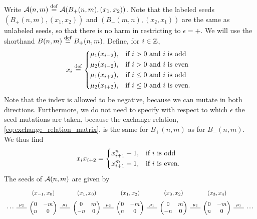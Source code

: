 \begin{example}
	Write $\mathcal{A}(n,m) \overset{\mathrm{def}}{=} \mathcal{A}(B_{+}(n,m), (x_1, x_2))$. Note that the labeled seeds
	$(B_{+}(n,m), (x_1, x_2))$ and $(B_{-}(m, n), (x_2, x_1))$ are the same as unlabeled
	seeds, so that there is no harm in restricting to $\epsilon = +$. We will use the
	shorthand $B(n,m) \overset{\mathrm{def}}{=} B_{+}(n,m)$. Define, for $i \in \mathbb{Z}$,
	\begin{equation*}
		x_i \defeq  \begin{dcases*}
			\mu_1 (x_{i-2}), & if $i > 0$ and $i$ is odd      \\
			\mu_2 (x_{i-2}), & if $i > 0$ and $i$ is even     \\
			\mu_1 (x_{i+2}), & if $i \leq 0$ and $i$ is odd   \\
			\mu_2 (x_{i+2}), & if $i \leq 0$ and $i$ is even.
		\end{dcases*}
	\end{equation*}
	Note that the index is allowed to be negative, because we can mutate in both directions. Furthermore, we do not need to specify with respect to which $\epsilon$ the seed mutations are taken, because
	the exchange relation, \cref{eq:exchange_relation_matrix}, is the same for $B_{+}(n,m)$
	as for $B_{-}(n,m)$. We thus find
	\begin{equation}\label{eq:recurrence_rank2}
		x_i x_{i+2} = \begin{dcases*}
			x_{i+1}^n + 1, & if $i$ is odd   \\
			x_{i+1}^m + 1, & if $i$ is even.
		\end{dcases*}
	\end{equation}
	The seeds of $\mathcal{A}(n,m)$ are given by
	\begin{equation*}
		\begin{tikzcd}[sep=scriptsize, row sep= 0.1em, ampersand replacement=\&]
			\& (x_{-1}, x_0) \& (x_{1}, x_0) \& (x_1, x_2) \& (x_3, x_2) \& (x_3, x_4)\\
			\cdots \rar[dash, "\mu_2"] \&\begin{pmatrix}
				0 & -m \\
				n & 0
			\end{pmatrix}
			\rar[dash, "\mu_1"] \&\begin{pmatrix}
				0  & m \\
				-n & 0
			\end{pmatrix}
			\rar[dash, "\mu_2"] \&\begin{pmatrix}
				0 & -m \\
				n & 0
			\end{pmatrix}
			\rar[dash, "\mu_1"] \&\begin{pmatrix}
				0  & m \\
				-n & 0
			\end{pmatrix}
			\rar[dash, "\mu_2"] \&\begin{pmatrix}
				0 & -m \\
				n & 0
			\end{pmatrix}
			\rar[dash, "\mu_1"] \& \cdots
		\end{tikzcd}
	\end{equation*}


\end{example}
